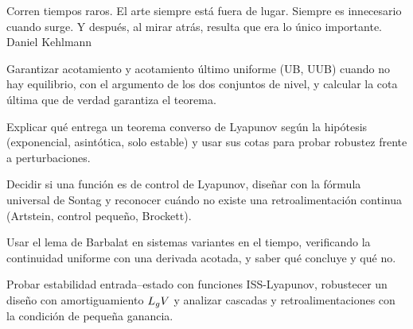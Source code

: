 
  {Corren tiempos raros. El arte siempre está fuera de lugar. Siempre es innecesario cuando surge. Y después, al mirar atrás, resulta que era lo único importante.}
  {Daniel Kehlmann}

\begin{objetivos}
  \item Garantizar acotamiento y acotamiento último uniforme (UB, UUB) cuando no hay equilibrio, con el argumento de los dos conjuntos de nivel, y calcular la cota última que de verdad garantiza el teorema.
  \item Explicar qué entrega un teorema converso de Lyapunov según la hipótesis (exponencial, asintótica, solo estable) y usar sus cotas para probar robustez frente a perturbaciones.
  \item Decidir si una función es de control de Lyapunov, diseñar con la fórmula universal de Sontag y reconocer cuándo no existe una retroalimentación continua (Artstein, control pequeño, Brockett).
  \item Usar el lema de Barbalat en sistemas variantes en el tiempo, verificando la continuidad uniforme con una derivada acotada, y saber qué concluye y qué no.
  \item Probar estabilidad entrada--estado con funciones ISS-Lyapunov, robustecer un diseño con amortiguamiento $L_{g}V$ y analizar cascadas y retroalimentaciones con la condición de pequeña ganancia.
\end{objetivos}









